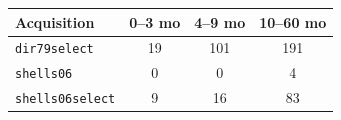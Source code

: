 \begin{tabular}{lccc}
\toprule
Acquisition & 0--3 mo & 4--9 mo & 10--60 mo \\
\midrule
\texttt{dir79select} & 19 & 101 & 191 \\
\texttt{shells06} & 0 & 0 & 4 \\
\texttt{shells06select} & 9 & 16 & 83 \\
\bottomrule
\end{tabular}

